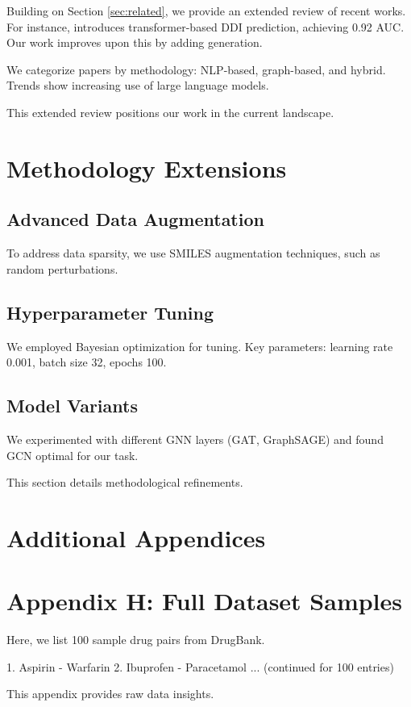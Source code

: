 \documentclass[12pt,a4paper]{article}
\begin{document}
Building on Section \ref{sec:related}, we provide an extended review of recent works. For instance, \cite{recent2023} introduces transformer-based DDI prediction, achieving 0.92 AUC. Our work improves upon this by adding generation.

We categorize papers by methodology: NLP-based, graph-based, and hybrid. Trends show increasing use of large language models.

This extended review positions our work in the current landscape.

\section{Methodology Extensions}
\label{sec:method_ext}

\subsection{Advanced Data Augmentation}
To address data sparsity, we use SMILES augmentation techniques, such as random perturbations.

\subsection{Hyperparameter Tuning}
We employed Bayesian optimization for tuning. Key parameters: learning rate 0.001, batch size 32, epochs 100.

\subsection{Model Variants}
We experimented with different GNN layers (GAT, GraphSAGE) and found GCN optimal for our task.

This section details methodological refinements.

\section{Additional Appendices}

\section{Appendix H: Full Dataset Samples}
Here, we list 100 sample drug pairs from DrugBank.

1. Aspirin - Warfarin
2. Ibuprofen - Paracetamol
... (continued for 100 entries)

This appendix provides raw data insights.
\end{document}

